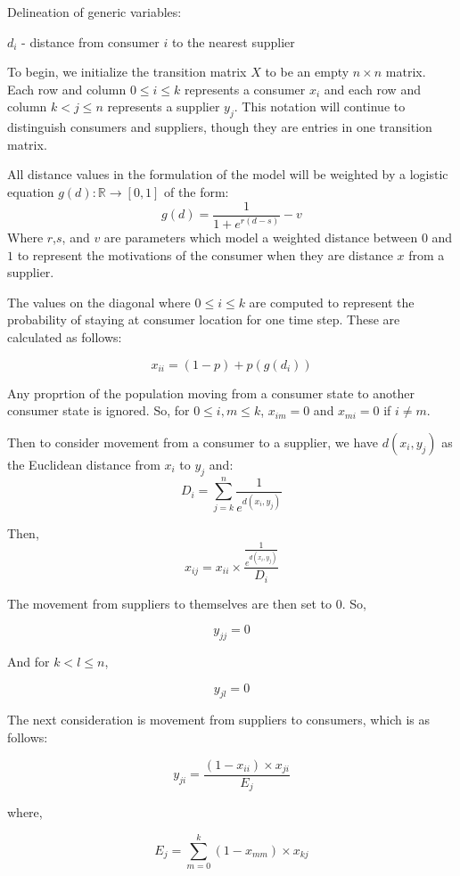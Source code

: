 \documentclass[twoside,twocolumn]{article}
\begin{document}
Delineation of generic variables:


$d_{i}$ - distance from consumer $i$ to the nearest supplier

To begin, we initialize the transition matrix $X$ to be an empty $n \times n$ matrix.
Each row and column $0 \leq i \leq k$ represents a consumer $x_i$ and each row and column $k < j \leq n$ represents a supplier $y_j$.
This notation will continue to distinguish consumers and suppliers, though they are entries in one transition matrix. %

All distance values in the formulation of the model will be weighted by a logistic equation $g(d): \mathbb{R} \rightarrow [0,1]$ of the form:
$$g(d) = \frac{1}{1 + e^{r(d-s)}} - v$$
Where $r$,$s$, and $v$ are parameters which model  a weighted distance between $0$ and $1$ to represent the motivations of the consumer when they are distance $x$ from a supplier. %

The values on the diagonal where $0 \leq i \leq k$ are computed to represent the probability of staying at consumer location for one time step.
These are calculated as follows:

$$x_{ii} = (1-p) + p(g(d_{i}))$$

Any proprtion of the population moving from a consumer state to another consumer state is ignored. %
So, for $0 \leq i,m \leq k$, $x_{im} = 0$ and $x_{mi} = 0$ if $i \neq m$.

Then to consider movement from a consumer to a supplier, we have $d(x_i, y_j)$ as the Euclidean distance from $x_i$ to $y_j$ and:
$$D_i = \sum_{j=k}^{n} \frac{1}{e^{d(x_i,y_j)}}$$

Then,
$$x_{ij} = x_{ii} \times \frac{\frac{1}{e^{d(x_i,y_j)}}}{D_i}$$

The movement from suppliers to themselves are then set to 0.
So,

$$y_{jj} = 0$$

And for $k < l \leq n$,

$$y_{jl} = 0$$ %

The next consideration is movement from suppliers to consumers, which is as follows:

$$y_{ji} = \frac{(1-x_{ii})\times x_{ji}}{E_j}$$

where, 

$$E_j = \sum_{m=0}^{k} (1-x_{mm})\times x_{kj}$$
\end{document}

